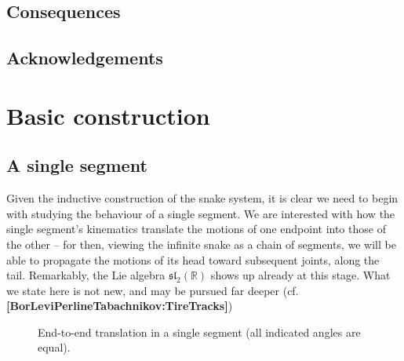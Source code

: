 \documentclass{article}
\def\fsl{\mathfrak{sl}}
\def\RR{\mathbb{R}}
\theoremstyle{definition}
\begin{document}
\subsection{Consequences}

\subsection{Acknowledgements}


\section{Basic construction}
\label{sec:basic}
\subsection{A single segment}
Given the inductive construction of the snake system,
it is clear we need to begin with studying the behaviour of a single
segment. We are interested with how the single segment's kinematics
translate the motions of one endpoint into those of the other -- for then,
viewing the infinite snake as a chain of segments, we will be able
to propagate the motions of its head toward subsequent joints, along the tail. 
Remarkably, the Lie algebra $\fsl_2(\RR)$ shows up already at this stage. 
What
we state here is not new, and may be pursued far deeper (cf. {\bf[BorLeviPerlineTabachnikov:TireTracks]})

\begin{figure} %
        \begin{center}\end{center}
        \caption{End-to-end translation in a single segment (all indicated angles
        are equal).\label{fig:seg}}
\end{figure}
\end{document}
